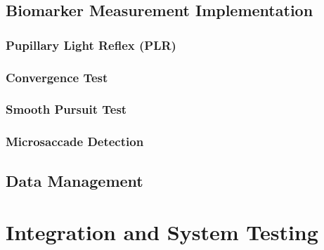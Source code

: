 

\subsection{Biomarker Measurement Implementation}


\subsubsection{Pupillary Light Reflex (PLR)}



\subsubsection{Convergence Test}



\subsubsection{Smooth Pursuit Test}



\subsubsection{Microsaccade Detection}



\subsection{Data Management}



\section{Integration and System Testing}

